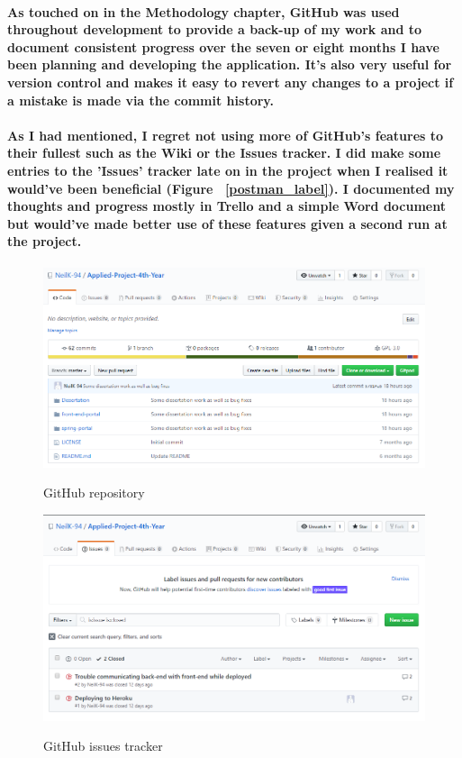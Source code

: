 \paragraph{As touched on in the Methodology chapter, GitHub was used throughout development to provide a back-up of my work and to document consistent progress over the seven or eight months I have been planning and developing the application. It's also very useful for version control and makes it easy to revert any changes to a project if a mistake is made via the commit history.}
\paragraph{As I had mentioned, I regret not using more of GitHub's features to their fullest such as the Wiki or the Issues tracker. I did make some entries to the 'Issues' tracker late on in the project when I realised it would've been beneficial (Figure ~\ref{postman_label}). I documented my thoughts and progress mostly in Trello and a simple Word document but would've made better use of these features given a second run at the project.}
\begin{figure}[h]
    \centering
    \begin{minipage}{0.5\textwidth}
        \centering
        \includegraphics[scale=0.25]{Images/github1.png} 
        \label{git1_label}
        \caption{GitHub repository}
    \end{minipage}\hfill
    \begin{minipage}{0.5\textwidth}
        \centering
        \includegraphics[scale=0.25]{Images/github2.png}
        \label{git2_label}
        \caption{GitHub issues tracker}
    \end{minipage}
\end{figure}

